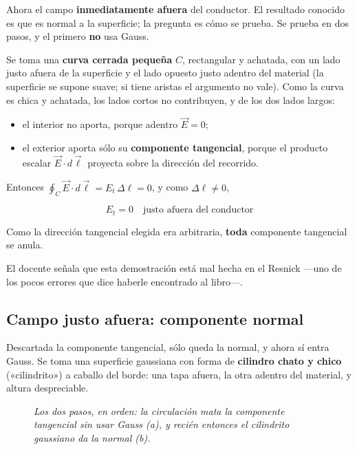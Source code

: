 \documentclass[12pt,a4paper]{article}
\begin{document}
Ahora el campo \textbf{inmediatamente afuera} del conductor. El resultado
conocido es que es normal a la superficie; la pregunta es cómo se prueba. Se
prueba en dos pasos, y el primero \textbf{no} usa Gauss.

Se toma una \textbf{curva cerrada pequeña} $C$, rectangular y achatada, con un
lado justo afuera de la superficie y el lado opuesto justo adentro del material
(la superficie se supone suave; si tiene aristas el argumento no vale). Como la
curva es chica y achatada, los lados cortos no contribuyen, y de los dos lados
largos:

\begin{itemize}[nosep]
  \item el interior no aporta, porque adentro $\vec E = 0$;
  \item el exterior aporta sólo su \textbf{componente tangencial}, porque el
        producto escalar $\vec E\cdot d\vec\ell$ proyecta sobre la dirección del
        recorrido.
\end{itemize}

Entonces $\oint_C \vec E\cdot d\vec\ell = E_t\,\Delta\ell = 0$, y como
$\Delta\ell \neq 0$,

\[
\boxed{\;E_t = 0 \quad\text{justo afuera del conductor}\;}
\]

Como la dirección tangencial elegida era arbitraria, \textbf{toda} componente
tangencial se anula.

\begin{notebox}
El docente señala que esta demostración está mal hecha en el Resnick ---uno de
los pocos errores que dice haberle encontrado al libro---.
\end{notebox}

\subsection{Campo justo afuera: componente normal}

Descartada la componente tangencial, sólo queda la normal, y ahora sí entra
Gauss. Se toma una superficie gaussiana con forma de \textbf{cilindro chato y
chico} («cilindrito») a caballo del borde: una tapa afuera, la otra adentro del
material, y altura despreciable.

\begin{figure}[H]
  \centering
  
  \caption*{\small\itshape Los dos pasos, en orden: la circulación mata la
  componente tangencial sin usar Gauss (a), y recién entonces el cilindrito
  gaussiano da la normal (b).}
\end{figure}
\end{document}

